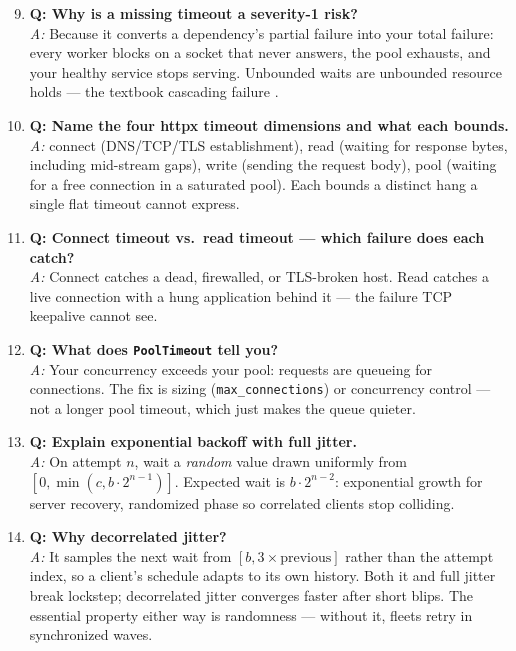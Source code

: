 \begin{enumerate}
  \setcounter{enumi}{8}
  \item \textbf{Q: Why is a missing timeout a severity-1 risk?}\\
        \textit{A:} Because it converts a dependency's partial failure into
        your total failure: every worker blocks on a socket that never
        answers, the pool exhausts, and your healthy service stops serving.
        Unbounded waits are unbounded resource holds --- the textbook
        cascading failure \cite{nygard2018releaseit}.

  \item \textbf{Q: Name the four httpx timeout dimensions and what each
        bounds.}\\
        \textit{A:} connect (DNS/TCP/TLS establishment), read (waiting for
        response bytes, including mid-stream gaps), write (sending the
        request body), pool (waiting for a free connection in a saturated
        pool). Each bounds a distinct hang a single flat timeout cannot
        express.

  \item \textbf{Q: Connect timeout vs.\ read timeout --- which failure does
        each catch?}\\
        \textit{A:} Connect catches a dead, firewalled, or TLS-broken host.
        Read catches a live connection with a hung application behind it ---
        the failure TCP keepalive cannot see.

  \item \textbf{Q: What does \texttt{PoolTimeout} tell you?}\\
        \textit{A:} Your concurrency exceeds your pool: requests are queueing
        for connections. The fix is sizing (\texttt{max\_connections}) or
        concurrency control --- not a longer pool timeout, which just makes
        the queue quieter.

  \item \textbf{Q: Explain exponential backoff with full jitter.}\\
        \textit{A:} On attempt $n$, wait a \emph{random} value drawn
        uniformly from $[0, \min(c, b \cdot 2^{n-1})]$. Expected wait is
        $b \cdot 2^{n-2}$: exponential growth for server recovery, randomized
        phase so correlated clients stop colliding.

  \item \textbf{Q: Why decorrelated jitter?}\\
        \textit{A:} It samples the next wait from $[b, 3 \times
        \text{previous}]$ rather than the attempt index, so a client's
        schedule adapts to its own history. Both it and full jitter break
        lockstep; decorrelated jitter converges faster after short blips. The
        essential property either way is randomness --- without it, fleets
        retry in synchronized waves.


\end{enumerate}

